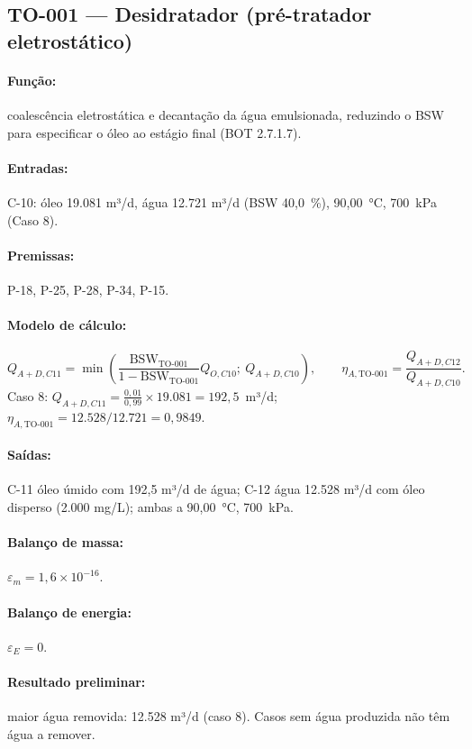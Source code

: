 \documentclass[11pt,a4paper]{article}
\numberwithin{equation}{section}
\numberwithin{table}{section}
\numberwithin{figure}{section}
\begin{document}
\subsection{TO-001 --- Desidratador (pré-tratador eletrostático)}
\paragraph{Função:} coalescência eletrostática e decantação da água emulsionada, reduzindo o BSW para especificar o óleo ao estágio final (BOT 2.7.1.7).
\paragraph{Entradas:} C-10: óleo 19.081 m³/d, água 12.721 m³/d (BSW 40,0~\%), 90,00~\si{\celsius}, 700~\si{\kilo\pascal} (Caso 8).
\paragraph{Premissas:} P-18, P-25, P-28, P-34, P-15.
\paragraph{Modelo de cálculo:}
\begin{equation}
Q_{A+D,C11}=\min\!\left(\frac{\mathrm{BSW}_{\mbox{TO-001}}}{1-\mathrm{BSW}_{\mbox{TO-001}}}Q_{O,C10};\ Q_{A+D,C10}\right),\qquad \eta_{A,\mbox{TO-001}}=\frac{Q_{A+D,C12}}{Q_{A+D,C10}}.
\end{equation}
Caso 8: $Q_{A+D,C11}=\frac{0{,}01}{0{,}99}\times19.081=192{,}5$~m³/d; $\eta_{A,\mbox{TO-001}}=12.528/12.721=0{,}9849$.

\paragraph{Saídas:} C-11 óleo úmido com 192,5 m³/d de água; C-12 água 12.528 m³/d com óleo disperso (2.000 mg/L); ambas a 90,00~\si{\celsius}, 700~\si{\kilo\pascal}.
\paragraph{Balanço de massa:} $\varepsilon_m=$$1{,}6\times10^{-16}$.
\paragraph{Balanço de energia:} $\varepsilon_E=$$0$.
\paragraph{Resultado preliminar:} maior água removida: 12.528 m³/d (caso 8). Casos sem água produzida não têm água a remover.
\end{document}
